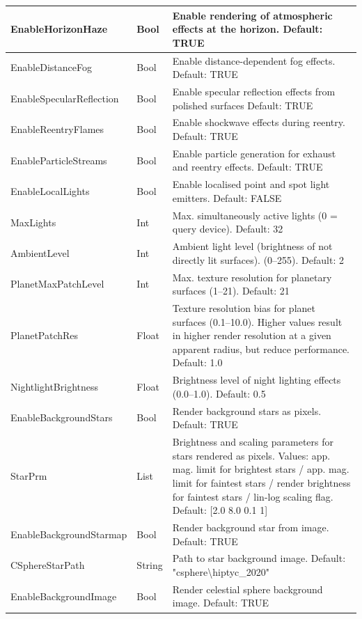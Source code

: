 \documentclass[Orbiter User Manual.tex]{subfiles}
\begin{document}
\begin{longtable}{ p{} p{}
		>{\RaggedRight}p{} }
	EnableHorizonHaze & Bool & Enable rendering of atmospheric effects at the
		horizon. Default: TRUE\\
	\hline
	EnableDistanceFog & Bool & Enable distance-dependent fog effects. Default:
		TRUE\\
	\hline
	EnableSpecular­Reflection & Bool & Enable specular reflection effects from
		polished surfaces Default: TRUE\\
	\hline
	EnableReentryFlames & Bool & Enable shockwave effects during reentry.
		Default: TRUE\\
	\hline
	EnableParticleStreams & Bool & Enable particle generation for exhaust and
		reentry effects. Default: TRUE\\
	\hline
	EnableLocalLights & Bool & Enable localised point and spot light emitters.
		Default: FALSE\\
	\hline
	MaxLights & Int & Max. simultaneously active lights (0 = query device).
		Default: 32\\
	\hline
	AmbientLevel & Int & Ambient light level (brightness of not directly lit
		surfaces). (0--255). Default: 2\\
	\hline
	PlanetMaxPatchLevel & Int & Max. texture resolution for planetary surfaces
		(1--21). Default: 21\\
	\hline
	PlanetPatchRes & Float & Texture resolution bias for planet surfaces
		(0.1--10.0). Higher values result in higher render resolution at a given
		apparent radius, but reduce performance. Default: 1.0\\
	\hline
	NightlightBrightness & Float & Brightness level of night lighting effects
		(0.0--1.0). Default: 0.5\\
	\hline
	EnableBackgroundStars & Bool & Render background stars as pixels. Default:
		TRUE\\
	\hline
	StarPrm & List & Brightness and scaling parameters for stars rendered as
		pixels. Values: app. mag. limit for brightest stars / app. mag. limit
		for faintest stars / render brightness for faintest stars / lin-log
		scaling flag. Default: [2.0 8.0 0.1 1]\\
	\hline
	EnableBackgroundStarmap & Bool & Render background star from image. Default:
		TRUE\\
	\hline
	CSphereStarPath & String & Path to star background image. Default:
		"csphere\textbackslash hiptyc\_2020"\\
	\hline
	EnableBackgroundImage & Bool & Render celestial sphere background image.
		Default: TRUE\\
	\hline

\end{longtable}
\end{document}
